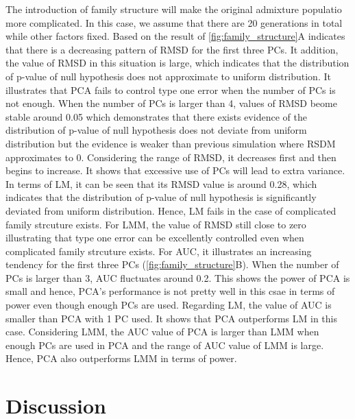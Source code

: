 \documentclass[11pt]{article}
\begin{document}
The introduction of family structure will make the original admixture populatio more complicated.
In this case, we assume that there are 20 generations in total while other factors fixed.
Based on the result of \cref{fig:family_structure}A indicates that there is a decreasing pattern of RMSD for the first three PCs.
It addition, the value of RMSD in this situation is large, which indicates that the distribution of p-value of null hypothesis does not approximate to uniform distribution.
It illustrates that PCA fails to control type one error when the number of PCs is not enough.
When the number of PCs is larger than 4, values of RMSD beome stable around 0.05 which demonstrates that there exists evidence of the distribution of p-value of null hypothesis does not deviate from uniform distribution but the evidence is weaker than previous simulation where RSDM approximates to 0.
Considering the range of RMSD, it decreases first and then begins to increase.
It shows that excessive use of PCs will lead to extra variance.
In terms of LM, it can be seen that its RMSD value is around 0.28, which indicates that the distribution of p-value of null hypothesis is significantly deviated from uniform distribution. Hence, LM fails in the case of complicated family strcuture exists.  
For LMM, the value of RMSD still close to zero illustrating that type one error can be excellently controlled even when complicated family strcuture exists.
For AUC, it illustrates an increasing tendency for the first three PCs (\cref{fig:family_structure}B).
When the number of PCs is larger than 3, AUC fluctuates around 0.2.
This shows the power of PCA is small and hence, PCA's performance is not pretty well in this csae in terms of power even though enough PCs are used. 
Regarding LM, the value of AUC is smaller than PCA with 1 PC used. 
It shows that PCA outperforms LM in this case.
Considering LMM, the AUC value of PCA is larger than LMM when enough PCs are used in PCA and the range of AUC value of LMM is large.
Hence, PCA also outperforms LMM in terms of power.



\section{Discussion}

\end{document}
